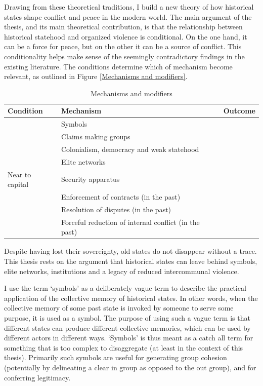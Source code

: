 
Drawing from these theoretical traditions, I build a new theory of how
historical states shape conflict and peace in the modern world. The main
argument of the thesis, and its main theoretical contribution, is that the
relationship between historical statehood and organized violence is conditional.
On the one hand, it can be a force for peace, but on the other it can be a
source of conflict. This conditionality helps make sense of the seemingly
contradictory findings in the existing literature. The conditions determine
which of mechanism become relevant, as outlined in Figure \ref{Mechanisms and
modifiers}.

\begin{table}[hpbt]
	\begin{tabularx}{\textwidth}{>{\centering\arraybackslash}X>{\centering\arraybackslash}X>{\centering\arraybackslash}X}
	\textbf{Condition} & \textbf{Mechanism} & \textbf{Outcome} \\
\toprule
	\multirow{4}{=}{\centering{Number and far from capital}} & Symbols & \multirow{4}{=}{\centering{Conflict}} \\
    	\cmidrule{2-2}
	& Claims making groups & \\
    	\cmidrule{2-2}
	& Colonialism, democracy and weak statehood & \\
	\cmidrule{2-2}
	& Elite networks & \\
	\midrule
	Near to capital & Security apparatus & \multirow{5}{=}{\centering{Peace}} \\
		\cmidrule{1-2}
	\multirow{3}{=}{\centering{Type of violence}} & Enforcement of contracts
						      (in the past) & \\
		\cmidrule{2-2}
	& Resolution of disputes (in the past) & \\
		\cmidrule{2-2}
	& Forceful reduction of internal conflict (in the past) & \\
	\bottomrule
\end{tabularx}
\caption{Mechanisms and modifiers}
\label{Mechanisms and modifiers}
\end{table}

Despite having lost their sovereignty, old states do not disappear without a
trace. This thesis rests on the argument that historical states can leave behind
symbols, elite networks, institutions and a legacy of reduced intercommunal
violence. 

I use the term `symbols' as a deliberately vague term to describe the practical
application of the collective memory of historical states. In other words, when
the collective memory of some past state is invoked by someone to serve some
purpose, it is used as a symbol. The purpose of using such a vague term is that
different states can produce different collective memories, which can be used by
different actors in different ways. `Symbols' is thus meant as a catch all term
for something that is too complex to disaggregate (at least in the context of
this thesis). Primarily such symbols are useful for generating group cohesion
(potentially by delineating a clear in group as opposed to the out group), and
for conferring legitimacy.


